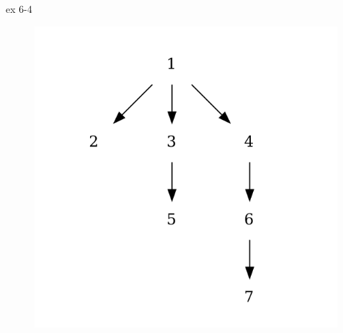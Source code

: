 \begin{exercise}
ex 6-4
\end{exercise}


\begin{figure}[hpbt]
\begin{center}
\includegraphics[width=0.3 \textwidth]{Ex6-4.png}
\end{center}
\end{figure}
